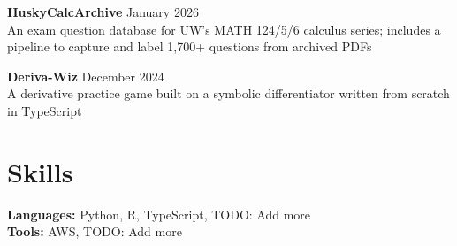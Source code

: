 \documentclass[11pt,letterpaper]{article}
\begin{document}
\textbf{HuskyCalcArchive} \hfill January 2026 \\
An exam question database for UW's MATH 124/5/6 calculus series; includes a pipeline to capture and label 1,700+ questions from archived PDFs

\vspace{4pt}

\textbf{Deriva-Wiz} \hfill December 2024 \\
A derivative practice game built on a symbolic differentiator written from scratch in TypeScript

\section{Skills}

\textbf{Languages:} Python, R, TypeScript, TODO: Add more \\[2pt]
\textbf{Tools:} AWS, TODO: Add more
\end{document}
